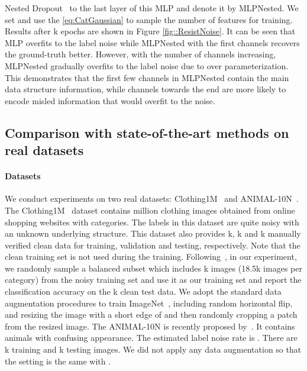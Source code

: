 \documentclass[final]{cvpr}
\begin{document}
Nested Dropout~\cite{rippel2014learning} to the last layer of this MLP and denote it by MLPNested. 
We set  and use the \eqref{eq:CatGaussian} to sample the number of features for training. 
Results after k epochs are shown in Figure \ref{fig::ResistNoise}.
It can be seen that MLP overfits to the label noise while MLPNested with the first  channels recovers the ground-truth  better. 
However, with the number of channels increasing, MLPNested gradually overfits to the label noise due to over parameterization. 
This demonstrates that the first few channels in MLPNested contain the main data structure information, while channels towards the end are more likely to encode misled information that would overfit to the noise.

\subsection{Comparison with state-of-the-art methods on real datasets}
\label{sec:compare}
\paragraph{Datasets} We conduct experiments on two real datasets: Clothing1M~\cite{xiao2015learning} and ANIMAL-10N~\cite{song2019selfie}. 
The Clothing1M~\cite{xiao2015learning} dataset contains  million clothing images obtained from online shopping websites with  categories. 
The labels in this dataset are quite noisy with an unknown underlying structure. 
This dataset also provides k, k and k manually verified clean data for training, validation and testing, respectively. Note that the clean training set is not used during the training. Following~\cite{PENCIL_CVPR_2019,zhang2021learning}, in our experiment, we randomly sample a balanced subset which includes k images (18.5k images per category) from the noisy training set and use it as our training set and report the classification accuracy on the k clean test data. 
We adopt the standard data augmentation procedures to train ImageNet~\cite{deng2009imagenet,he2016deep}, including random horizontal flip, and resizing the image with a short edge of  and then randomly cropping a  patch from the resized image. 
The ANIMAL-10N is recently proposed by~\cite{song2019selfie}. 
It contains  animals with confusing appearance. The estimated label noise rate is . There are k training and k testing images. 
We did not apply any data augmentation so that the setting is the same with \cite{song2019selfie}.
\end{document}
